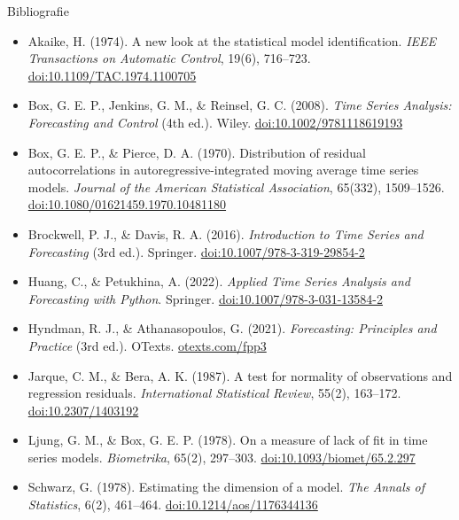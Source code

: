 \begin{frame}{Bibliografie}
\itemsize{\tiny}
\begin{itemize}
    \item Akaike, H. (1974). A new look at the statistical model identification. \textit{IEEE Transactions on Automatic Control}, 19(6), 716--723. \href{https://doi.org/10.1109/TAC.1974.1100705}{doi:10.1109/TAC.1974.1100705}
    \item Box, G. E. P., Jenkins, G. M., \& Reinsel, G. C. (2008). \textit{Time Series Analysis: Forecasting and Control} (4th ed.). Wiley. \href{https://doi.org/10.1002/9781118619193}{doi:10.1002/9781118619193}
    \item Box, G. E. P., \& Pierce, D. A. (1970). Distribution of residual autocorrelations in autoregressive-integrated moving average time series models. \textit{Journal of the American Statistical Association}, 65(332), 1509--1526. \href{https://doi.org/10.1080/01621459.1970.10481180}{doi:10.1080/01621459.1970.10481180}
    \item Brockwell, P. J., \& Davis, R. A. (2016). \textit{Introduction to Time Series and Forecasting} (3rd ed.). Springer. \href{https://doi.org/10.1007/978-3-319-29854-2}{doi:10.1007/978-3-319-29854-2}
    \item Huang, C., \& Petukhina, A. (2022). \textit{Applied Time Series Analysis and Forecasting with Python}. Springer. \href{https://doi.org/10.1007/978-3-031-13584-2}{doi:10.1007/978-3-031-13584-2}
    \item Hyndman, R. J., \& Athanasopoulos, G. (2021). \textit{Forecasting: Principles and Practice} (3rd ed.). OTexts. \href{https://otexts.com/fpp3/}{otexts.com/fpp3}
    \item Jarque, C. M., \& Bera, A. K. (1987). A test for normality of observations and regression residuals. \textit{International Statistical Review}, 55(2), 163--172. \href{https://doi.org/10.2307/1403192}{doi:10.2307/1403192}
    \item Ljung, G. M., \& Box, G. E. P. (1978). On a measure of lack of fit in time series models. \textit{Biometrika}, 65(2), 297--303. \href{https://doi.org/10.1093/biomet/65.2.297}{doi:10.1093/biomet/65.2.297}
    \item Schwarz, G. (1978). Estimating the dimension of a model. \textit{The Annals of Statistics}, 6(2), 461--464. \href{https://doi.org/10.1214/aos/1176344136}{doi:10.1214/aos/1176344136}
\end{itemize}
\end{frame}


